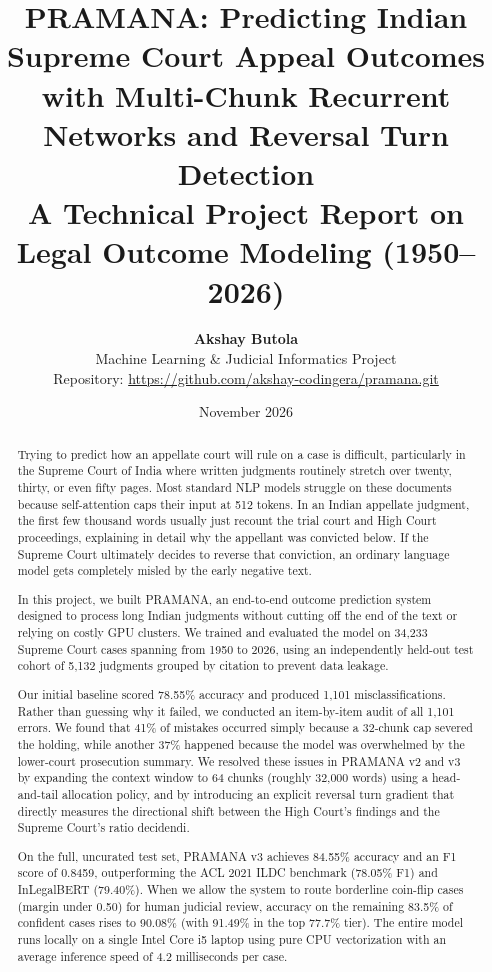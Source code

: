 \documentclass[11pt,a4paper]{article}
\title{\textbf{PRAMANA: Predicting Indian Supreme Court Appeal Outcomes with Multi-Chunk Recurrent Networks and Reversal Turn Detection}\\\large A Technical Project Report on Legal Outcome Modeling (1950--2026)}
\author{\textbf{Akshay Butola}\\
Machine Learning & Judicial Informatics Project\\
Repository: \url{https://github.com/akshay-codingera/pramana.git}}
\date{November 2026}
\begin{document}
\maketitle

\begin{abstract}
Trying to predict how an appellate court will rule on a case is difficult, particularly in the Supreme Court of India where written judgments routinely stretch over twenty, thirty, or even fifty pages. Most standard NLP models struggle on these documents because self-attention caps their input at 512 tokens. In an Indian appellate judgment, the first few thousand words usually just recount the trial court and High Court proceedings, explaining in detail why the appellant was convicted below. If the Supreme Court ultimately decides to reverse that conviction, an ordinary language model gets completely misled by the early negative text.

In this project, we built PRAMANA, an end-to-end outcome prediction system designed to process long Indian judgments without cutting off the end of the text or relying on costly GPU clusters. We trained and evaluated the model on 34,233 Supreme Court cases spanning from 1950 to 2026, using an independently held-out test cohort of 5,132 judgments grouped by citation to prevent data leakage. 

Our initial baseline scored 78.55\% accuracy and produced 1,101 misclassifications. Rather than guessing why it failed, we conducted an item-by-item audit of all 1,101 errors. We found that 41\% of mistakes occurred simply because a 32-chunk cap severed the holding, while another 37\% happened because the model was overwhelmed by the lower-court prosecution summary. We resolved these issues in PRAMANA v2 and v3 by expanding the context window to 64 chunks (roughly 32,000 words) using a head-and-tail allocation policy, and by introducing an explicit reversal turn gradient that directly measures the directional shift between the High Court's findings and the Supreme Court's ratio decidendi.

On the full, uncurated test set, PRAMANA v3 achieves 84.55\% accuracy and an F1 score of 0.8459, outperforming the ACL 2021 ILDC benchmark (78.05\% F1) and InLegalBERT (79.40\%). When we allow the system to route borderline coin-flip cases (margin under 0.50) for human judicial review, accuracy on the remaining 83.5\% of confident cases rises to 90.08\% (with 91.49\% in the top 77.7\% tier). The entire model runs locally on a single Intel Core i5 laptop using pure CPU vectorization with an average inference speed of 4.2 milliseconds per case.
\end{abstract}
\end{document}
